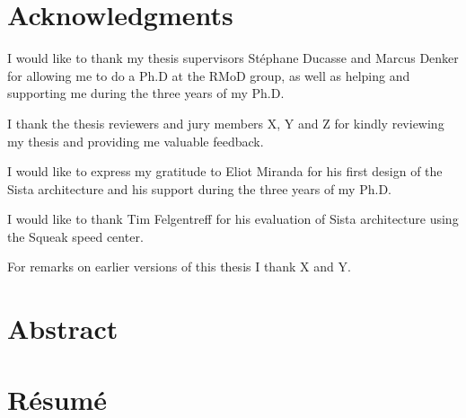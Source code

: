 \documentclass[a4paper,12pt,twoside]{includes/ThesisStyle}
\begin{document}

\dominitoc


\cleardoublepage

\section*{Acknowledgments}

I would like to thank my thesis supervisors St\'ephane Ducasse and Marcus Denker for allowing me to do a Ph.D at the RMoD group, as well as helping and supporting me during the three years of my Ph.D.

I thank the thesis reviewers and jury members X, Y and Z for kindly reviewing my thesis and providing me valuable feedback.

I would like to express my gratitude to Eliot Miranda for his first design of the Sista architecture and his support during the three years of my Ph.D. 

I would like to thank Tim Felgentreff for his evaluation of Sista architecture using the Squeak speed center.

For remarks on earlier versions of this thesis I thank X and Y.

\cleardoublepage

\section*{Abstract}



\cleardoublepage

\section*{R\'esum\'e}

\tableofcontents
\listoffigures

\mainmatter








%



\appendix






\end{document}
